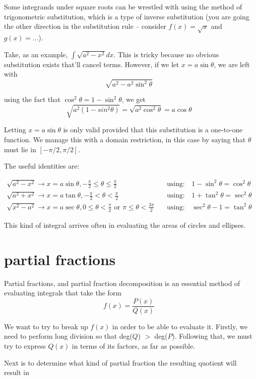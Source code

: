 \documentclass[10pt,a4paper]{report}
\begin{document}
Some integrands under square roots can be wrestled with using the method of trigonometric substitution, which is a type of inverse substitution (you are going the other direction in the substitution rule -- consider $f(x) = \sqrt{x}$ and $g(x) = ...$).

Take, as an example, $\int \sqrt{a^2 - x^2} dx$. This is tricky because no obvious substitution exists that'll cancel terms. However, if we let $x = a \sin \theta$, we are left with
$$
	\sqrt{a^2 - a^2 \sin^2 \theta}
$$

using the fact that $\cos^2 \theta = 1 - \sin^2 \theta $, we get
$$
	\sqrt{a^2 (1 - sin^2 \theta)} = \sqrt{a^2 \cos^2 \theta} = a \cos \theta
$$

Letting $x = a \sin \theta$ is only valid provided that this substitution is a one-to-one function. We manage this with a domain restriction, in this case by saying that $\theta$ must lie in $[-\pi/2, \pi/2]$.

The useful identities are:

\begin{align*}
	\sqrt{a^2 - x^2} \to x = a \sin \theta, -\frac{\pi}{2} \leq \theta \leq \frac{\pi}{2} \quad & \text{using:} \quad 1 - \sin^2 \theta = \cos^2 \theta \\
	\sqrt{a^2 + x^2} \to x = a \tan \theta, -\frac{\pi}{2} < \theta < \frac{\pi}{2} \quad & \text{using:} \quad 1 + \tan^2 \theta = \sec^2 \theta \\
	\sqrt{x^2 - a^2} \to x = a \sec \theta, 0 \leq \theta < \frac{\pi}{2} \text{ or } \pi \leq \theta < \frac{3\pi}{2} \quad & \text{using:} \quad \sec^2 \theta - 1 = \tan^2 \theta
\end{align*}

This kind of integral arrives often in evaluating the areas of circles and ellipses.

\section{partial fractions}

Partial fractions, and partial fraction decomposition is an essential method of evaluating integrals that take the form
$$
	f(x) = \frac{P(x)}{Q(x)}
$$

We want to try to break up $f(x)$ in order to be able to evaluate it. Firstly, we need to perform long division so that deg($Q$) $>$ deg($P$). Following that, we must try to express $Q(x)$ in terms of its factors, as far as possible.

Next is to determine what kind of partial fraction the resulting quotient will result in
\end{document}
